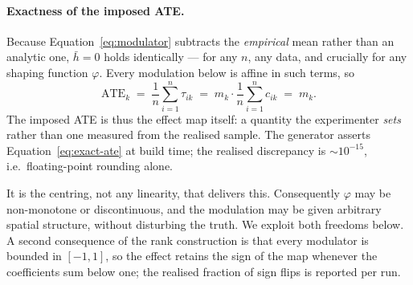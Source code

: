 \paragraph{Exactness of the imposed ATE.}
Because Equation~\eqref{eq:modulator} subtracts the \emph{empirical} mean rather than an
analytic one, $\bar{h} = 0$ holds identically --- for any $n$, any data, and crucially for any
shaping function $\varphi$. Every modulation below is affine in such terms, so
\begin{equation}
    \mathrm{ATE}_k \;=\; \frac{1}{n}\sum_{i=1}^n \tau_{ik}
    \;=\; m_k \cdot \frac{1}{n}\sum_{i=1}^n c_{ik}
    \;=\; m_k .
    \label{eq:exact-ate}
\end{equation}
The imposed ATE is thus the effect map itself: a quantity the experimenter \emph{sets} rather
than one measured from the realised sample. The generator asserts
Equation~\eqref{eq:exact-ate} at build time; the realised discrepancy is $\sim 10^{-15}$,
i.e.\ floating-point rounding alone.

It is the centring, not any linearity, that delivers this. Consequently $\varphi$ may be
non-monotone or discontinuous, and the modulation may be given arbitrary spatial structure,
without disturbing the truth. We exploit both freedoms below. A second consequence of the
rank construction is that every modulator is bounded in $[-1,1]$, so the effect retains the
sign of the map whenever the coefficients sum below one; the realised fraction of sign flips
is reported per run.

